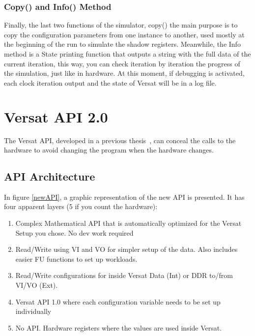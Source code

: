 \documentclass[conference]{IEEEtran}
\begin{document}
\subsubsection{Copy() and Info() Method}

Finally, the last two functions of the simulator, copy() the main purpose is to copy the configuration parameters from one instance to another,
used mostly at the beginning of the run to simulate the shadow registers.
Meanwhile, the Info method is a State printing function that outputs a string with the full data of the current iteration,
this way, you can check iteration by iteration the progress of the simulation, just like in hardware.
At this moment, if debugging is activated, each clock iteration output and the state of Versat will be in a log file.

% 






\section{Versat API 2.0}
\label{chapter:API}

The Versat API, developed in a previous thesis~\cite{valter:deepversat}, can conceal
the calls to the hardware to avoid changing the program when the hardware changes.

% 

\subsection{API Architecture}

In figure \ref{newAPI}, a graphic representation of the new API is presented. It has four apparent layers (5 if you count the hardware):

\begin{enumerate}
	\item Complex Mathematical API that is automatically optimized for the Versat Setup you chose. No dev work required
	\item Read/Write using VI and VO for simpler setup of the data. Also includes easier FU functions to set up workloads.
	\item Read/Write configurations for inside Versat Data (Int) or DDR to/from VI/VO (Ext).
	\item Versat API 1.0 where each configuration variable needs to be set up individually
	\item No API. Hardware registers where the values are used inside Versat. 
  \end{enumerate}
\end{document}
